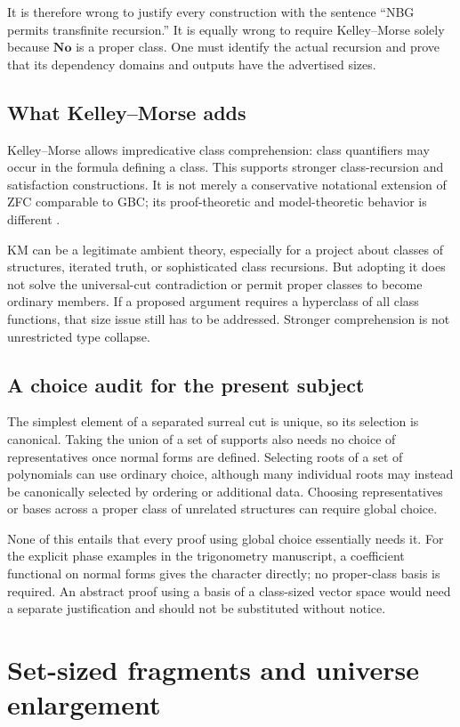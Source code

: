 \documentclass[11pt,letterpaper]{article}
\numberwithin{equation}{section}
\theoremstyle{definition}
\theoremstyle{remark}
\newcommand{\No}{\mathbf{No}}
\begin{document}
It is therefore wrong to justify every construction with the sentence ``NBG permits transfinite recursion.'' It is equally wrong to require Kelley--Morse solely because $\No$ is a proper class. One must identify the actual recursion and prove that its dependency domains and outputs have the advertised sizes.

\subsection{What Kelley--Morse adds}
Kelley--Morse allows impredicative class comprehension: class quantifiers may occur in the formula defining a class. This supports stronger class-recursion and satisfaction constructions. It is not merely a conservative notational extension of ZFC comparable to GBC; its proof-theoretic and model-theoretic behavior is different \cite{Williams,ClassForcing}.

KM can be a legitimate ambient theory, especially for a project about classes of structures, iterated truth, or sophisticated class recursions. But adopting it does not solve the universal-cut contradiction or permit proper classes to become ordinary members. If a proposed argument requires a hyperclass of all class functions, that size issue still has to be addressed. Stronger comprehension is not unrestricted type collapse.

\subsection{A choice audit for the present subject}
The simplest element of a separated surreal cut is unique, so its selection is canonical. Taking the union of a set of supports also needs no choice of representatives once normal forms are defined. Selecting roots of a set of polynomials can use ordinary choice, although many individual roots may instead be canonically selected by ordering or additional data. Choosing representatives or bases across a proper class of unrelated structures can require global choice.

None of this entails that every proof using global choice essentially needs it. For the explicit phase examples in the trigonometry manuscript, a coefficient functional on normal forms gives the character directly; no proper-class basis is required. An abstract proof using a basis of a class-sized vector space would need a separate justification and should not be substituted without notice.

\section{Set-sized fragments and universe enlargement}\label{sec:fragments}
\end{document}
